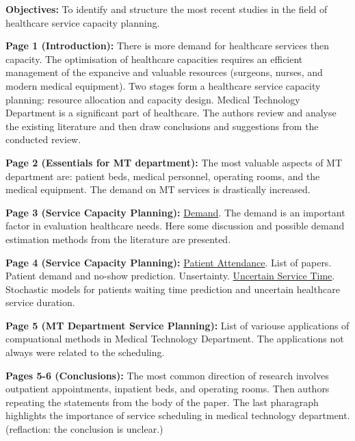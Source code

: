     \textbf{Objectives:}
    To identify and structure the most recent studies in the field of healthcare service capacity planning.
    
    \textbf{Page 1 (Introduction):}
    There is more demand for healthcare services then capacity. The optimisation of healthcare capacities requires an efficient management of the expancive and valuable resources (surgeons, nurses, and modern medical equipment). Two stages form a healthcare service capacity planning: resource allocation and capacity design. Medical Technology Department is a significant part of healthcare. The authors review and analyse the existing literature and then draw conclusions and suggestions from the conducted review.  
    
    \textbf{Page 2 (Essentials for MT department):}
    The most valuable aspects of MT department are: patient beds, medical personnel, operating rooms, and the medical equipment. The demand on MT services is drastically increased.

    \textbf{Page 3 (Service Capacity Planning):}
    \underline{Demand}. The demand is an important factor in evaluation healthcare needs. Here some discussion and possible demand estimation methods from the literature are presented. 

    \textbf{Page 4 (Service Capacity Planning):}
    \underline{Patient Attendance}. List of papers. Patient demand and no-show prediction. Unsertainty. \underline{Uncertain Service Time}. Stochastic models for patients waiting time prediction and uncertain healthcare service duration.
    
    \textbf{Page 5 (MT Department Service Planning):}
    List of variouse applications of compuational methods in Medical Technology Department. The applications not always were related to the scheduling.
    
    \textbf{Pages 5-6 (Conclusions):}
    The most common direction of research involves outpatient appointments, inpatient beds, and operating rooms. Then authors repeating the statements from the body of the paper. The last pharagraph highlights the importance of service scheduling in medical technology department. (reflaction: the conclusion is unclear.) 